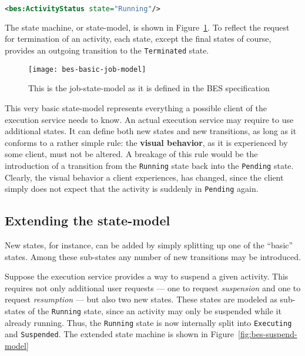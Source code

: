 \begin{lstlisting}[language=XML]
  <bes:ActivityStatus state="Running"/>
\end{lstlisting}

The     state     machine,     or     state-model,     is     shown     in
Figure~\ref{fig:bes-basic}. To  reflect the request for  termination of an
activity,  each state,  except the  final  states of  course, provides  an
outgoing transition to the \texttt{Terminated} state.

\begin{figure}[h]
  \centering
  \texttt{[image: bes-basic-job-model]}
  \caption[Basic BES Job-State-Model]{This is the job-state-model as it is
    defined in the BES specification \cite{ogsa-bes}}
  \label{fig:bes-basic}
\end{figure}

This very basic state-model represents everything a possible client of the
execution service needs  to know. An actual execution  service may require
to  use  additional  states.   It  can  define both  new  states  and  new
transitions,  as  long  as  it  conforms  to a  rather  simple  rule:  the
\textbf{visual behavior}, as it is experienced by some client, must not be
altered. A breakage of this rule would be the introduction of a transition
from  the \texttt{Running}  state  back into  the \texttt{Pending}  state.
Clearly, the visual behavior a  client experiences, has changed, since the
client  simply  does   not  expect  that  the  activity   is  suddenly  in
\texttt{Pending} again.

\subsection{Extending the state-model}

New states, for  instance, can be added by simply splitting  up one of the
``basic'' states.   Among these sub-states  any number of  new transitions
may be introduced.

Suppose the execution service provides  a way to suspend a given activity.
This  requires  not only  additional  user  requests  --- one  to  request
\emph{suspension} and  one to request  \emph{resumption} --- but  also two
new states. These states are modeled as sub-states of the \texttt{Running}
state, since an  activity may only be suspended  while it already running.
Thus,   the  \texttt{Running}   state   is  now   internally  split   into
\texttt{Executing} and  \texttt{Suspended}. The extended  state machine is
shown in Figure~\ref{fig:bes-suspend-model}

